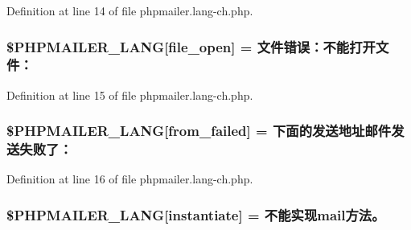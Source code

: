 Definition at line 14 of file phpmailer.\+lang-\/ch.\+php.

\subsubsection[{\texorpdfstring{\$\+P\+H\+P\+M\+A\+I\+L\+E\+R\+\_\+\+L\+A\+NG}{$PHPMAILER_LANG}}]{\setlength{\rightskip}{0pt plus 5cm}\$P\+H\+P\+M\+A\+I\+L\+E\+R\+\_\+\+L\+A\+NG\mbox{[}\textquotesingle{}file\+\_\+open\textquotesingle{}\mbox{]} = \textquotesingle{}文件错误：不能打开文件：\textquotesingle{}}\hypertarget{phpmailer_8lang-ch_8php_a28d1a6517bf4c942a0ddd506188ad2e0}{}\label{phpmailer_8lang-ch_8php_a28d1a6517bf4c942a0ddd506188ad2e0}


Definition at line 15 of file phpmailer.\+lang-\/ch.\+php.

\subsubsection[{\texorpdfstring{\$\+P\+H\+P\+M\+A\+I\+L\+E\+R\+\_\+\+L\+A\+NG}{$PHPMAILER_LANG}}]{\setlength{\rightskip}{0pt plus 5cm}\$P\+H\+P\+M\+A\+I\+L\+E\+R\+\_\+\+L\+A\+NG\mbox{[}\textquotesingle{}from\+\_\+failed\textquotesingle{}\mbox{]} = \textquotesingle{}下面的发送地址邮件发送失败了： \textquotesingle{}}\hypertarget{phpmailer_8lang-ch_8php_adf832ae12155a09be077c6d5e4fd7e22}{}\label{phpmailer_8lang-ch_8php_adf832ae12155a09be077c6d5e4fd7e22}


Definition at line 16 of file phpmailer.\+lang-\/ch.\+php.

\subsubsection[{\texorpdfstring{\$\+P\+H\+P\+M\+A\+I\+L\+E\+R\+\_\+\+L\+A\+NG}{$PHPMAILER_LANG}}]{\setlength{\rightskip}{0pt plus 5cm}\$P\+H\+P\+M\+A\+I\+L\+E\+R\+\_\+\+L\+A\+NG\mbox{[}\textquotesingle{}instantiate\textquotesingle{}\mbox{]} = \textquotesingle{}不能实现mail方法。\textquotesingle{}}\hypertarget{phpmailer_8lang-ch_8php_ad58dde16780f4770ccf4dd282ea1f5ad}{}\label{phpmailer_8lang-ch_8php_ad58dde16780f4770ccf4dd282ea1f5ad}



